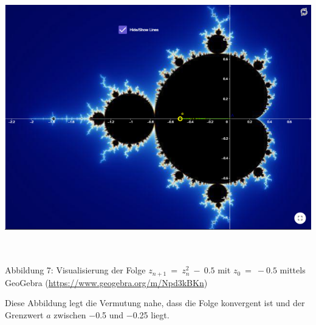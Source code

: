 \documentclass{book}
\begin{document}
\includegraphics[width=6.33858in,height=4.65409in]{image12.png}

\protect\hypertarget{_Toc167901657}{}{}Abbildung 7: Visualisierung der
Folge \(z_{n + 1}\  = \ z_{n}^{2}\  - \ 0.5\) mit \(z_{0}\  = \  - 0.5\)
mittels GeoGebra (\url{https://www.geogebra.org/m/Npd3kBKn})

Diese Abbildung legt die Vermutung nahe, dass die Folge konvergent ist
und der Grenzwert \(a\) zwischen \(-\)0.5 und \(-\)0.25 liegt.
\end{document}
